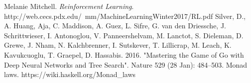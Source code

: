 \documentclass[12pt,a4paper]{article}
\begin{document}
	\pagebreak
	\begin{thebibliography}{9}
		Melanie  Mitchell.
		\textit{Reinforcement Learning}.
		http://web.cecs.pdx.edu/~mm/MachineLearningWinter2017/RL.pdf
		Silver, D., A. Huang, Aja, C. Maddison, A. Guez, L. Sifre, G. van den Driessche, J. Schrittwieser, I. Antonoglou, V. Panneershelvam, M. Lanctot, S. Dieleman, D. Grewe, J. Nham, N. Kalchbrenner, I. Sutskever, T. Lillicrap, M. Leach, K. Kavukcuoglu, T. Graepel, D. Hassabis. 2016. "Mastering the Game of Go with Deep Neural Networks and Tree Search". Nature 529 (28 Jan): 484--503.
		Monad laws.
		https://wiki.haskell.org/Monad\_laws
	\end{thebibliography}
	
	
            
            
\end{document}
